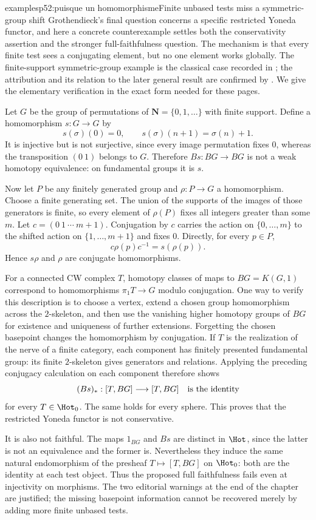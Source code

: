 \begin{dcomment}{examples}{p52:puisque un homomorphisme}{Finite unbased tests miss a symmetric-group shift}
Grothendieck's final question concerns a specific restricted Yoneda functor, and here a concrete counterexample settles both the conservativity assertion and the stronger full-faithfulness question. The mechanism is that every finite test sees a conjugating element, but no one element works globally. The finite-support symmetric-group example is the classical case recorded in \citet[Proposition~4.1]{MatumotoMinamiSugawara1984}; the attribution and its relation to the later general result are confirmed by \citet[Remark~2.3]{ArlinChristensen2023}. We give the elementary verification in the exact form needed for these pages.

Let $G$ be the group of permutations of $\mathbf N=\{0,1,\ldots\}$ with finite support. Define a homomorphism $s:G\to G$ by
\[
 s(\sigma)(0)=0,\qquad s(\sigma)(n+1)=\sigma(n)+1.
\]
It is injective but is not surjective, since every image permutation fixes $0$, whereas the transposition $(0\ 1)$ belongs to $G$. Therefore $Bs:BG\to BG$ is not a weak homotopy equivalence: on fundamental groups it is $s$.

Now let $P$ be any finitely generated group and $\rho:P\to G$ a homomorphism. Choose a finite generating set. The union of the supports of the images of those generators is finite, so every element of $\rho(P)$ fixes all integers greater than some $m$. Let $c=(0\ 1\ \cdots\ m+1)$. Conjugation by $c$ carries the action on $\{0,\ldots,m\}$ to the shifted action on $\{1,\ldots,m+1\}$ and fixes $0$. Directly, for every $p\in P$,
\[
 c\rho(p)c^{-1}=s(\rho(p)).
\]
Hence $s\rho$ and $\rho$ are conjugate homomorphisms.

For a connected CW complex $T$, homotopy classes of maps to $BG=K(G,1)$ correspond to homomorphisms $\pi_1T\to G$ modulo conjugation. One way to verify this description is to choose a vertex, extend a chosen group homomorphism across the $2$-skeleton, and then use the vanishing higher homotopy groups of $BG$ for existence and uniqueness of further extensions. Forgetting the chosen basepoint changes the homomorphism by conjugation. If $T$ is the realization of the nerve of a finite category, each component has finitely presented fundamental group: its finite $2$-skeleton gives generators and relations. Applying the preceding conjugacy calculation on each component therefore shows
\[
 (Bs)_*:[T,BG]\longrightarrow[T,BG]
       \quad\hbox{is the identity}
\]
for every $T\in\Hot_0$. The same holds for every sphere. This proves that the restricted Yoneda functor is not conservative.

It is also not faithful. The maps $1_{BG}$ and $Bs$ are distinct in $\Hot$, since the latter is not an equivalence and the former is. Nevertheless they induce the same natural endomorphism of the presheaf $T\mapsto[T,BG]$ on $\Hot_0$: both are the identity at each test object. Thus the proposed full faithfulness fails even at injectivity on morphisms. The two editorial warnings at the end of the chapter are justified; the missing basepoint information cannot be recovered merely by adding more finite unbased tests.
\end{dcomment}

